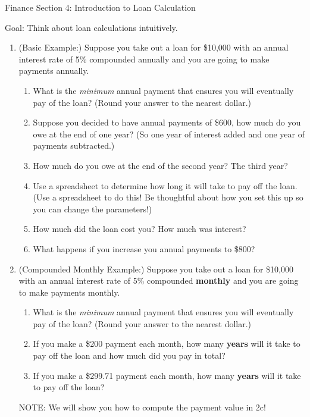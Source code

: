 \documentclass[12pt]{article}
\begin{document}
\begin{center}
{\large  Finance Section 4: Introduction to Loan Calculation}
\end{center}
Goal: Think about loan calculations intuitively.

\begin{enumerate}
\item  (Basic Example:) Suppose you take out a loan for \$10,000 with an annual interest rate of 5\% compounded annually and you are going to make payments annually.
	\begin{enumerate}
	\item What is the \textit{minimum} annual payment that ensures you will eventually pay of the loan? (Round your answer to the nearest dollar.)
	\vfill
	\item Suppose you decided to have annual payments of \$600, how much do you owe at the end of one year? (So one year of interest added and one year of payments subtracted.)
	\vfill
	\item How much do you owe at the end of the second year? The third year?
	\vfill
	\item Use a spreadsheet to determine how long it will take to pay off the loan. (Use a spreadsheet to do this! Be thoughtful about how you set this up so you can change the parameters!)
	\vfill
	\item How much did the loan cost you? How much was interest?
	\vfill
	\item What happens if you increase you annual payments to \$800?
	\vfill
	\end{enumerate}
\newpage
\item (Compounded Monthly Example:) Suppose you take out a loan for \$10,000 with an annual interest rate of 5\% compounded \textbf{monthly} and you are going to make payments monthly.
	\begin{enumerate}
	\item What is the \textit{minimum} annual payment that ensures you will eventually pay of the loan? (Round your answer to the nearest dollar.)
	\vfill
	\item If you make a \$200 payment each month, how many \textbf{years} will it take to pay off the loan and how much did you pay in total?
	\vfill
	\item If you make a \$299.71 payment each month, how many \textbf{years} will it take to pay off the loan?
	\vfill
	
	\end{enumerate}
NOTE: We will show you how to compute the payment value in 2c!
\end{enumerate}
\end{document}
